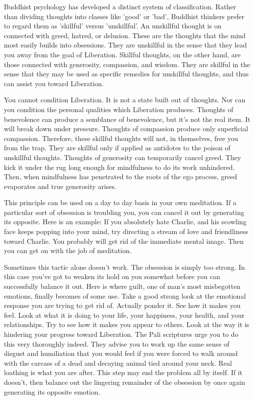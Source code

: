 Buddhist psychology has developed a distinct system of classification. Rather
than dividing thoughts into classes like 'good' or 'bad', Buddhist thinkers
prefer to regard them as 'skillful' versus 'unskillful'. An unskillful thought
is on connected with greed, hatred, or delusion. These are the thoughts that the
mind most easily builds into obsessions. They are unskillful in the sense that
they lead you away from the goal of Liberation. Skillful thoughts, on the other
hand, are those connected with generosity, compassion, and wisdom. They are
skillful in the sense that they may be used as specific remedies for unskillful
thoughts, and thus can assist you toward Liberation.

You cannot condition Liberation. It is not a state built out of thoughts. Nor can you condition the personal qualities which
Liberation produces. Thoughts of benevolence can produce a semblance of benevolence, but it's not the real item. It will break
down under pressure. Thoughts of compassion produce only superficial compassion. Therefore, these skillful thoughts will not, in
themselves, free you from the trap. They are skillful only if applied as antidotes to the poison of unskillful thoughts. Thoughts of
generosity can temporarily cancel greed. They kick it under the rug long enough for mindfulness to do its work unhindered. Then,
when mindfulness has penetrated to the roots of the ego process, greed evaporates and true generosity arises.

This principle can be used on a day to day basis in your own meditation. If a
particular sort of obsession is troubling you, you can cancel it out by
generating its opposite. Here is an example: If you absolutely hate Charlie, and
his scowling face keeps popping into your mind, try directing a stream of love
and friendliness toward Charlie. You probably will get rid of the immediate
mental image. Then you can get on with the job of meditation.

Sometimes this tactic alone doesn't work. The obsession is simply too strong. In
this case you've got to weaken its hold on you somewhat before you can
successfully balance it out. Here is where guilt, one of man's most misbegotten
emotions, finally becomes of some use. Take a good strong look at the emotional
response you are trying to get rid of. Actually ponder it. See how it makes you
feel. Look at what it is doing to your life, your happiness, your health, and
your relationships. Try to see how it makes you appear to others. Look at the
way it is hindering your progress toward Liberation. The Pali scriptures urge
you to do this very thoroughly indeed. They advise you to work up the same sense
of disgust and humiliation that you would feel if you were forced to walk around
with the carcass of a dead and decaying animal tied around your neck. Real
loathing is what you are after. This step may end the problem all by itself. If
it doesn't, then balance out the lingering remainder of the obsession by once
again generating its opposite emotion.

